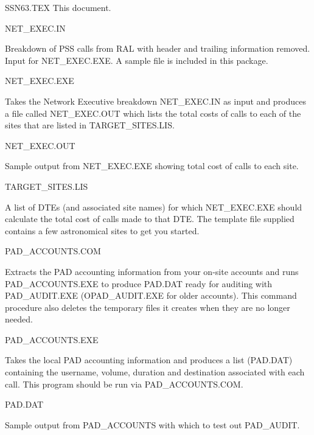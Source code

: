 \newlength{\numlen}
\settowidth{\numlen}{0000000000000000000000}
\settowidth{\labelsep}{000}
\begin{list}{}{\setlength{\labelwidth}{\numlen}
\setlength{\leftmargin}{\numlen}
\addtolength{\leftmargin}{\labelsep}}

\item [SSN63.TEX] This document.

\item [NET\_\/EXEC.IN]

Breakdown of PSS calls from RAL
with header and trailing information
removed. Input for NET\_\/EXEC.EXE.
A sample file is included in this
package.

\item [NET\_\/EXEC.EXE]

Takes the Network Executive breakdown
NET\_\/EXEC.IN as input and produces a file
called NET\_\/EXEC.OUT which lists
the total costs of calls to each of
the sites that are
listed in TARGET\_\/SITES.LIS.

\item [NET\_\/EXEC.OUT]

Sample output from NET\_\/EXEC.EXE showing
total cost of calls to each site.

\item [TARGET\_\/SITES.LIS]

A list of DTEs (and associated site names)
for which NET\_\/EXEC.EXE should calculate
the total cost of calls made to that DTE.
The template file supplied contains a few
astronomical sites to get you started.

\item [PAD\_\/ACCOUNTS.COM]

Extracts the PAD accounting information
from your on-site accounts and runs
PAD\_\/ACCOUNTS.EXE to produce PAD.DAT
ready for auditing with PAD\_\/AUDIT.EXE
(OPAD\_\/AUDIT.EXE for older accounts).
This command procedure also deletes the
temporary files it creates when they are
no longer needed.

\item [PAD\_\/ACCOUNTS.EXE]

Takes the local PAD accounting information
and produces a list (PAD.DAT) containing
the username, volume, duration
and destination associated with each call.
This program should be run via
PAD\_\/ACCOUNTS.COM.

\item [PAD.DAT]

Sample output from PAD\_\/ACCOUNTS with which
to test out PAD\_\/AUDIT.


\end{list}
